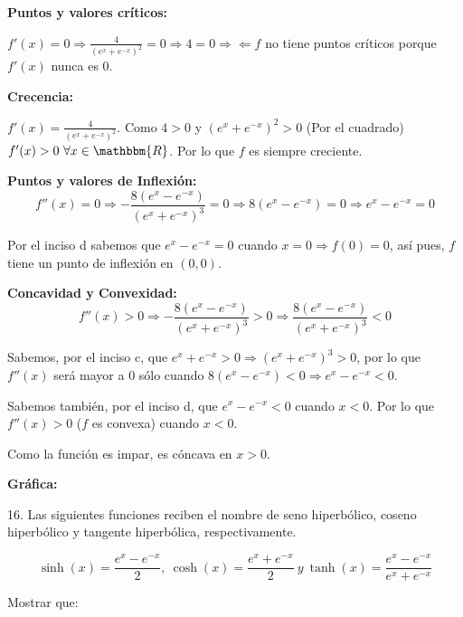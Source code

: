 \documentclass[12pt]{article}
\begin{document}
\begin{enumerate}[\hspace{9px} a)]
        \textbf{Puntos y valores cr\'iticos: }\medskip

            \(f'(x)=0 \Longrightarrow \frac{4}{(e^x+e^{-x})^2}=0 \Longrightarrow 4=0\Rightarrow\!\Leftarrow\)\quad \(f\) no tiene puntos cr\'iticos porque \(f'(x)\) nunca es 0.\medskip

        \textbf{Crecencia: }\medskip

            \(f'(x)=\frac{4}{(e^x+e^{-x})^2}\). Como $4>0$ y $(e^x+e^{-x})^2>0$ (Por el cuadrado) \(f'(x)>0 \ \forall x\in \mathbbm{R}\). Por lo que $f$ es siempre creciente.\medskip

        \textbf{Puntos y valores de Inflexi\'on: }
            \[f''(x)=0 \Longrightarrow -\frac{8(e^x-e^{-x})}{(e^x+e^{-x})^3}=0 \Longrightarrow 8(e^x-e^{-x})=0 \Longrightarrow e^x-e^{-x}=0\]

            Por el inciso d sabemos que \(e^x-e^{-x}=0\) cuando \(x=0 \Longrightarrow f(0)=0\), as\'i pues, $f$ tiene un punto de inflexi\'on en \((0,0)\).\medskip

        \textbf{Concavidad y Convexidad: }\medskip
            \[f''(x)>0 \Longrightarrow -\frac{8(e^x-e^{-x})}{(e^x+e^{-x})^3}>0 \Longrightarrow \frac{8(e^x-e^{-x})}{(e^x+e^{-x})^3}<0\]

            Sabemos, por el inciso c, que \(e^x+e^{-x}>0 \Longrightarrow (e^x+e^{-x})^3>0\), por lo que \(f''(x)\) ser\'a mayor a 0 s\'olo cuando \(8(e^x-e^{-x})<0 \Longrightarrow e^x-e^{-x}<0\).\medskip

            Sabemos tambi\'en, por el inciso d, que \(e^x-e^{-x}<0\) cuando \(x<0\). Por lo que \(f''(x)>0\) ($f$ es convexa) cuando \(x<0\).\medskip

            Como la funci\'on es impar, es c\'oncava en \(x>0\).\medskip

        \textbf{Gr\'afica: }

\end{enumerate}

16. Las siguientes funciones reciben el nombre de seno hiperb\'olico, coseno hiperb\'olico y tangente hiperb\'olica, respectivamente.

\begin{equation*}
    \sinh(x)=\frac{e^x-e^{-x}}{2}, \ \cosh(x)=\frac{e^x+e^{-x}}{2} \ y \ \tanh(x)=\frac{e^x-e^{-x}}{e^x+e^{-x}}
\end{equation*}

Mostrar que:
\end{document}
